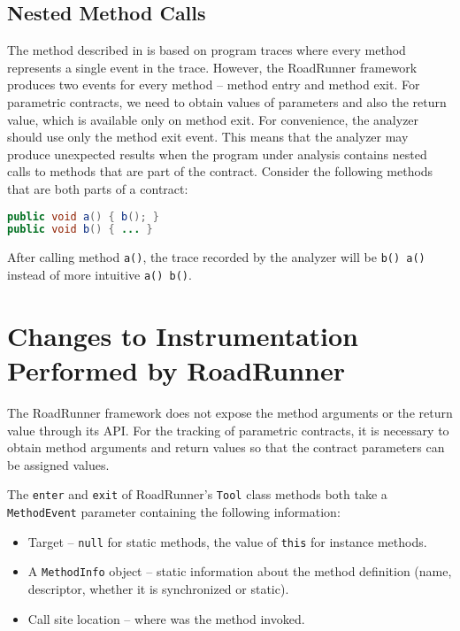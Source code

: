 \subsection{Nested Method Calls}

The method described in \cite{contracts} is based on program traces where
every method represents a single event in the trace. However, the RoadRunner
framework produces two events for every method -- method entry and method exit.
For parametric contracts, we need to obtain values of parameters and also the
return value, which is available only on method exit. For convenience, the
analyzer should use only the method exit event. This means that the analyzer may
produce unexpected results when the program under analysis contains nested calls
to methods that are part of the contract. Consider the following methods that
are both parts of a contract:

\begin{lstlisting}[language=java]
public void a() { b(); }
public void b() { ... }
\end{lstlisting}

After calling method \texttt{a()}, the trace recorded by the analyzer will be
\texttt{b() a()} instead of more intuitive \texttt{a() b()}.

\section{Changes to Instrumentation Performed by RoadRunner}
\label{instrChanges}

The RoadRunner framework does not expose the method arguments or the return
value through its API. For the tracking of parametric contracts, it is necessary
to obtain method arguments and return values so that the contract parameters
can be assigned values.

The \texttt{enter} and \texttt{exit} of RoadRunner's \texttt{Tool} class methods
both take a \texttt{MethodEvent} parameter containing the following information:
\begin{itemize}
    \item Target -- \texttt{null} for static methods, the value of \texttt{this}
        for instance methods.
    \item A \texttt{MethodInfo} object -- static information about the method
        definition (name, descriptor, whether it is synchronized or static).
    \item Call site location -- where was the method invoked.
\end{itemize}

